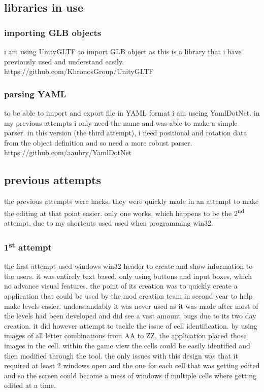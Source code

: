 \subsection {libraries in use}

\subsubsection*{importing GLB objects}
i am using UnityGLTF to import GLB object as this is a library that i have previously used and understand easily.\\
https://github.com/KhronosGroup/UnityGLTF
\subsubsection*{parsing YAML}
to be able to import and export file in YAML format i am useing YamlDotNet. in my previous attempts i only need the name and was able to make a simple parser. in this version (the third attempt), i need positional and rotation data from the object definition and so need a more robust parser. \\
https://github.com/aaubry/YamlDotNet

\subsection{previous attempts}
the previous attempts were hacks. they were quickly made in an attempt to make the editing at that point easier. only one works, which happens to be the 2\textsuperscript{nd} attempt, due to my shortcuts used used when programming win32.
\subsubsection{1\textsuperscript{st} attempt}
the first attempt used windows win32 header to create and show information to the users. it was entirely text based, only using buttons and input boxes, which no advance visual features. the point of its creation was to quickly create a application that could be used by the mod creation team in second year to help make levels easier. understandably it was never used as it was made after most of the levels had been developed and did see a vast amount bugs due to its two day creation. 
it did however attempt to tackle the issue of cell identification. by using images of all letter combinations from AA to ZZ, the application placed those images in the cell. within the game view the cells could be easily identified and then modified through the tool. the only issues with this design was that it required at least 2 windows open and the one for each cell that was getting edited and so the screen could become a mess of windows if multiple cells where getting edited at a time.
